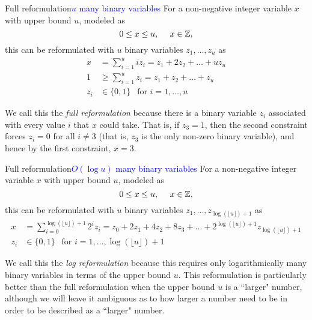 \documentclass[../open-optimization/open-optimization.tex]{subfiles}
\begin{document}
\begin{general}{Full reformulation}{\textcolor{blue}{$u$ many binary variables}}
\label{general:full-reformulation}
For a non-negative integer variable $x$ with upper bound $u$, modeled as 
\begin{equation}
0 \leq x \leq u, \ \ \ \ x \in {\mathbb{Z}},
\end{equation}
this can be reformulated with $u$ binary variables $z_1, \dots, z_u$ as 
\begin{equation}
\begin{split}
x & = \sum_{i=1}^u i z_i = z_1 + 2 z_2 + \dots + u z_u\\
1 & \geq \sum_{i=1}^u z_i = z_1 + z_2 + \dots + z_u\\
z_i & \in \{0,1\} \ \ \text{ for } i=1, \dots, u
\end{split}
\end{equation}
\end{general}
We call this the \emph{full reformulation} because there is a binary variable $z_i$ associated with every value $i$ that $x$ could take.  That is, if $z_3 = 1$, then the second constraint forces $z_i = 0$ for all $i \neq 3$ (that is, $z_3$ is the only non-zero binary variable), and hence by the first constraint, $x = 3$.

\begin{general}{Full reformulation}{\textcolor{blue}{$O(\log u)$ many binary variables}}
\label{general:log-reformulation}
For a non-negative integer variable $x$ with upper bound $u$, modeled as 
\begin{equation}
0 \leq x \leq u, \ \ \ \ x \in {\mathbb{Z}},
\end{equation}
this can be reformulated with $u$ binary variables $z_1, \dots, z_{\log(\lfloor u \rfloor)+ 1}$ as 
\begin{equation}
\begin{split}
x & = \sum_{i=0}^{\log(\lfloor u \rfloor)+ 1}2^i z_i = z_0 + 2 z_1 +  4 z_2 + 8 z_3 + \dots + 2^{\log(\lfloor u \rfloor) + 1} z_{\log(\lfloor u \rfloor)+ 1}\\
z_i & \in \{0,1\} \ \ \text{ for } i=1, \dots, \log(\lfloor u \rfloor)+ 1
\end{split}
\end{equation}
\end{general}
We call this the \emph{log reformulation} because this requires only logarithmically many binary variables in terms of the upper bound $u$.   This reformulation is particularly better than the full reformulation when the upper bound $u$ is a ``larger" number, although we will leave it ambiguous as to how larger a number need to be in order to be described as a ``larger" number. 
\end{document}

